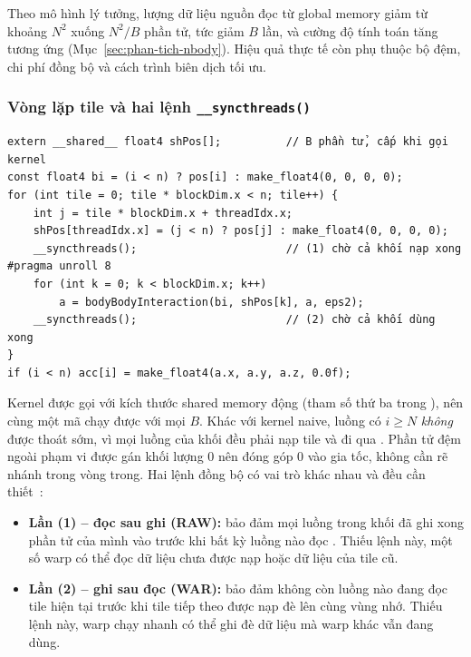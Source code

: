 Theo mô hình lý tưởng, lượng dữ liệu nguồn đọc từ global memory giảm từ khoảng $N^2$ xuống $N^2/B$ phần tử, tức giảm $B$ lần, và cường độ tính toán tăng tương ứng (Mục~\ref{sec:phan-tich-nbody}). Hiệu quả thực tế còn phụ thuộc bộ đệm, chi phí đồng bộ và cách trình biên dịch tối ưu.

\subsubsection{Vòng lặp tile và hai lệnh \texttt{\_\_syncthreads()}}

\begin{lstlisting}[language=CUDA]
extern __shared__ float4 shPos[];          // B phần tử, cấp khi gọi kernel
const float4 bi = (i < n) ? pos[i] : make_float4(0, 0, 0, 0);
for (int tile = 0; tile * blockDim.x < n; tile++) {
    int j = tile * blockDim.x + threadIdx.x;
    shPos[threadIdx.x] = (j < n) ? pos[j] : make_float4(0, 0, 0, 0);
    __syncthreads();                       // (1) chờ cả khối nạp xong
#pragma unroll 8
    for (int k = 0; k < blockDim.x; k++)
        a = bodyBodyInteraction(bi, shPos[k], a, eps2);
    __syncthreads();                       // (2) chờ cả khối dùng xong
}
if (i < n) acc[i] = make_float4(a.x, a.y, a.z, 0.0f);
\end{lstlisting}

Kernel được gọi với kích thước shared memory động  (tham số thứ ba trong ), nên cùng một mã chạy được với mọi $B$. Khác với kernel naive, luồng có $i \ge N$ \emph{không} được thoát sớm, vì mọi luồng của khối đều phải nạp tile và đi qua . Phần tử đệm ngoài phạm vi được gán khối lượng 0 nên đóng góp 0 vào gia tốc, không cần rẽ nhánh trong vòng trong. Hai lệnh đồng bộ có vai trò khác nhau và đều cần thiết~\cite{gpugems3}:
\begin{itemize}
\item \textbf{Lần (1) -- đọc sau ghi (RAW):} bảo đảm mọi luồng trong khối đã ghi xong phần tử của mình vào  trước khi bất kỳ luồng nào đọc . Thiếu lệnh này, một số warp có thể đọc dữ liệu chưa được nạp hoặc dữ liệu của tile cũ.
\item \textbf{Lần (2) -- ghi sau đọc (WAR):} bảo đảm không còn luồng nào đang đọc tile hiện tại trước khi tile tiếp theo được nạp đè lên cùng vùng nhớ. Thiếu lệnh này, warp chạy nhanh có thể ghi đè dữ liệu mà warp khác vẫn đang dùng.
\end{itemize}

